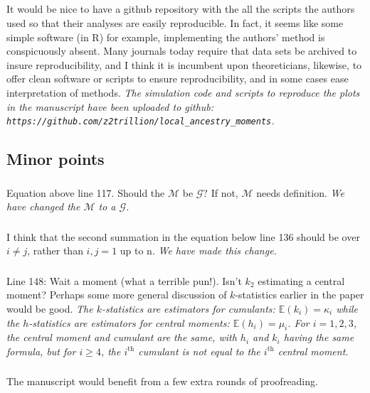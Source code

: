 \documentclass[11pt]{amsart}
\begin{document}
\subsection{} It would be nice to have a github repository with the all the scripts the authors used so that their
analyses are easily reproducible. In fact, it seems like some simple software (in R) for example,
implementing the authors' method is conspicuously absent. Many journals today require that data sets be
archived to insure reproducibility, and I think it is incumbent upon theoreticians, likewise, to offer clean
software or scripts to ensure reproducibility, and in some cases ease interpretation of methods.
\textit{The simulation code and scripts to reproduce the plots in the manuscript have been uploaded to github:  \texttt{https://github.com/z2trillion/local\_ancestry\_moments}.} 

\subsection*{Minor points}
\subsubsection{} Equation above line 117. Should the $\mathcal{M}$ be $\mathcal{G}?$ If not, $\mathcal{M}$ needs definition. \textit{We have changed the $\mathcal{M}$ to a $\mathcal{G}$.}
\subsubsection{} I think that the second summation in the equation below line 136 should be over $i\neq j$, rather than
$i,j = 1$ up to n.
\textit{We have made this change.}
\subsubsection{} Line 148: Wait a moment (what a terrible pun!). Isn't $k_2$ estimating a central moment? Perhaps some more general discussion of $k$-statistics earlier in the paper would be good. 
\textit{The $k$-statistics are estimators for cumulants: $\mathbb{E}(k_i) = \kappa_i$ while the $h$-statistics are estimators for central moments: $\mathbb{E}(h_i) = \mu_i$. For $i=1,2,3$, the central moment and cumulant are the same, with $h_i$ and $k_i$ having the same formula, but for $i\geq 4$, the $i^\text{th}$ cumulant is not equal to the $i^\text{th}$ central moment.}
\subsubsection{} The manuscript would benefit from a few extra rounds of proofreading.
\end{document}
